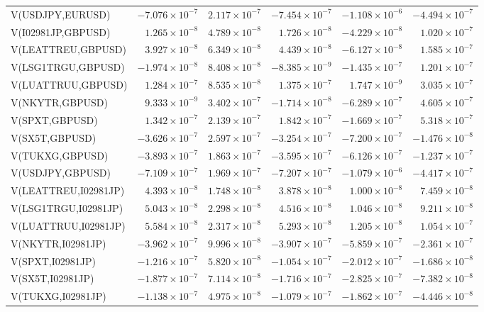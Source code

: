\documentclass[10pt,a4paper]{article}
\begin{document}
\begin{tabular*}{\linewidth}{@{\extracolsep{\fill}}lrrrrr@{}}
V(USDJPY,EURUSD) & $-7.076\times10^{-7}$ & $2.117\times10^{-7}$ & $-7.454\times10^{-7}$ & $-1.108\times10^{-6}$ & $-4.494\times10^{-7}$ \\
V(I02981JP,GBPUSD) & $1.265\times10^{-8}$ & $4.789\times10^{-8}$ & $1.726\times10^{-8}$ & $-4.229\times10^{-8}$ & $1.020\times10^{-7}$ \\
V(LEATTREU,GBPUSD) & $3.927\times10^{-8}$ & $6.349\times10^{-8}$ & $4.439\times10^{-8}$ & $-6.127\times10^{-8}$ & $1.585\times10^{-7}$ \\
V(LSG1TRGU,GBPUSD) & $-1.974\times10^{-8}$ & $8.408\times10^{-8}$ & $-8.385\times10^{-9}$ & $-1.435\times10^{-7}$ & $1.201\times10^{-7}$ \\
V(LUATTRUU,GBPUSD) & $1.284\times10^{-7}$ & $8.535\times10^{-8}$ & $1.375\times10^{-7}$ & $1.747\times10^{-9}$ & $3.035\times10^{-7}$ \\
V(NKYTR,GBPUSD) & $9.333\times10^{-9}$ & $3.402\times10^{-7}$ & $-1.714\times10^{-8}$ & $-6.289\times10^{-7}$ & $4.605\times10^{-7}$ \\
V(SPXT,GBPUSD) & $1.342\times10^{-7}$ & $2.139\times10^{-7}$ & $1.842\times10^{-7}$ & $-1.669\times10^{-7}$ & $5.318\times10^{-7}$ \\
V(SX5T,GBPUSD) & $-3.626\times10^{-7}$ & $2.597\times10^{-7}$ & $-3.254\times10^{-7}$ & $-7.200\times10^{-7}$ & $-1.476\times10^{-8}$ \\
V(TUKXG,GBPUSD) & $-3.893\times10^{-7}$ & $1.863\times10^{-7}$ & $-3.595\times10^{-7}$ & $-6.126\times10^{-7}$ & $-1.237\times10^{-7}$ \\
V(USDJPY,GBPUSD) & $-7.109\times10^{-7}$ & $1.969\times10^{-7}$ & $-7.207\times10^{-7}$ & $-1.079\times10^{-6}$ & $-4.417\times10^{-7}$ \\
V(LEATTREU,I02981JP) & $4.393\times10^{-8}$ & $1.748\times10^{-8}$ & $3.878\times10^{-8}$ & $1.000\times10^{-8}$ & $7.459\times10^{-8}$ \\
V(LSG1TRGU,I02981JP) & $5.043\times10^{-8}$ & $2.298\times10^{-8}$ & $4.516\times10^{-8}$ & $1.046\times10^{-8}$ & $9.211\times10^{-8}$ \\
V(LUATTRUU,I02981JP) & $5.584\times10^{-8}$ & $2.317\times10^{-8}$ & $5.293\times10^{-8}$ & $1.205\times10^{-8}$ & $1.054\times10^{-7}$ \\
V(NKYTR,I02981JP) & $-3.962\times10^{-7}$ & $9.996\times10^{-8}$ & $-3.907\times10^{-7}$ & $-5.859\times10^{-7}$ & $-2.361\times10^{-7}$ \\
V(SPXT,I02981JP) & $-1.216\times10^{-7}$ & $5.820\times10^{-8}$ & $-1.054\times10^{-7}$ & $-2.012\times10^{-7}$ & $-1.686\times10^{-8}$ \\
V(SX5T,I02981JP) & $-1.877\times10^{-7}$ & $7.114\times10^{-8}$ & $-1.716\times10^{-7}$ & $-2.825\times10^{-7}$ & $-7.382\times10^{-8}$ \\
V(TUKXG,I02981JP) & $-1.138\times10^{-7}$ & $4.975\times10^{-8}$ & $-1.079\times10^{-7}$ & $-1.862\times10^{-7}$ & $-4.446\times10^{-8}$ \\
\bottomrule
\end{tabular*}\endgroup
\end{document}
